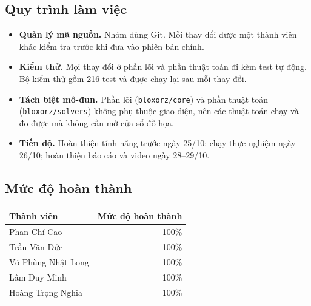\subsection{Quy trình làm việc}

\begin{itemize}
\item \textbf{Quản lý mã nguồn.} Nhóm dùng Git. Mỗi thay đổi được một thành viên khác kiểm tra trước khi đưa vào phiên bản chính.
\item \textbf{Kiểm thử.} Mọi thay đổi ở phần lõi và phần thuật toán đi kèm test tự động. Bộ kiểm thử gồm 216 test và được chạy lại sau mỗi thay đổi.
\item \textbf{Tách biệt mô-đun.} Phần lõi (\texttt{bloxorz/core}) và phần thuật toán (\texttt{bloxorz/solvers}) không phụ thuộc giao diện, nên các thuật toán chạy và đo được mà không cần mở cửa sổ đồ họa.
\item \textbf{Tiến độ.} Hoàn thiện tính năng trước ngày 25/10; chạy thực nghiệm ngày 26/10; hoàn thiện báo cáo và video ngày 28–29/10.
\end{itemize}

\subsection{Mức độ hoàn thành}

{\renewcommand{\arraystretch}{1.25}
\begin{longtable}{|l|r|}
\hline
\textbf{Thành viên} & \textbf{Mức độ hoàn thành} \\ \hline
\endhead
\hline
\endlastfoot
Phan Chí Cao & 100\% \\ \hline
Trần Văn Đức & 100\% \\ \hline
Võ Phùng Nhật Long & 100\% \\ \hline
Lâm Duy Minh & 100\% \\ \hline
Hoàng Trọng Nghĩa & 100\% \\
\end{longtable}
}
